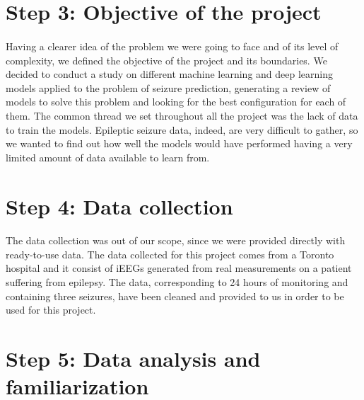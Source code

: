 
\section{Step 3: Objective of the project} \label{sec: step_objective_project}
\paragraph{} Having a clearer idea of the problem we were going to face and of its level of complexity, we defined the objective of the project and its boundaries. We decided to conduct a study on different machine learning and deep learning models applied to the problem of seizure prediction, generating a review of models to solve this problem and looking for the best configuration for each of them. The common thread we set throughout all the project was the lack of data to train the models. Epileptic seizure data, indeed, are very difficult to gather, so we wanted to find out how well the models would have performed having a very limited amount of data available to learn from.


\section{Step 4: Data collection} \label{sec: step_data_collection}
\paragraph{} The data collection was out of our scope, since we were provided directly with ready-to-use data. The data collected for this project comes from a Toronto hospital and it consist of iEEGs generated from real measurements on a patient suffering from epilepsy. The data, corresponding to 24 hours of monitoring and containing three seizures, have been cleaned and provided to us in order to be used for this project.


\section{Step 5: Data analysis and familiarization} \label{sec: step_data_analysis_familiarization}
